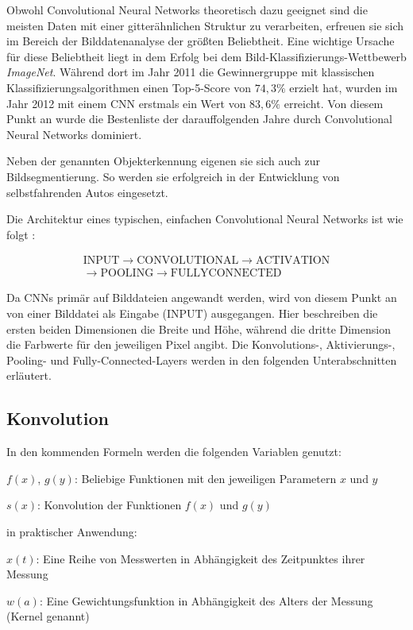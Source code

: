 Obwohl Convolutional Neural Networks theoretisch dazu geeignet sind die meisten Daten mit einer gitterähnlichen Struktur zu verarbeiten, erfreuen sie sich im Bereich der Bilddatenanalyse der größten Beliebtheit. \cite[Kap.~9]{deeplearning_16} Eine wichtige Ursache für diese Beliebtheit liegt \bspw in dem Erfolg bei dem Bild-Klassifizierungs-Wettbewerb \textit{ImageNet}. Während dort im Jahr 2011 die Gewinnergruppe mit klassischen Klassifizierungsalgorithmen einen Top-5-Score von $74,3\%$ erzielt hat, wurden im Jahr 2012 mit einem CNN erstmals ein Wert von $83,6\%$ erreicht. Von diesem Punkt an wurde die Bestenliste der darauffolgenden Jahre durch Convolutional Neural Networks dominiert. \cite[Kap.~1]{deeplearning_18}

Neben der genannten Objekterkennung eigenen sie sich auch zur Bildsegmentierung. So werden sie \bspw erfolgreich in der Entwicklung von selbstfahrenden Autos eingesetzt. \cite{kaymak_19}

Die Architektur eines typischen, einfachen Convolutional Neural Networks ist wie folgt \cite{cs231n}:

\begin{multline*}
\mathrm{INPUT}\rightarrow\mathrm{CONVOLUTIONAL}\rightarrow\mathrm{ACTIVATION}\\\rightarrow\mathrm{POOLING}\rightarrow\mathrm{FULLYCONNECTED}
\end{multline*}

Da CNNs primär auf Bilddateien angewandt werden, wird von diesem Punkt an von einer Bilddatei als Eingabe ($\mathrm{INPUT}$) ausgegangen. Hier beschreiben die ersten beiden Dimensionen die Breite und Höhe, während die dritte Dimension die Farbwerte für den jeweiligen Pixel angibt. Die Konvolutions-, Aktivierungs-, Pooling- und Fully-Connected-Layers werden in den folgenden Unterabschnitten erläutert.

\subsection{Konvolution}
\label{ssec:conv}

\noindent In den kommenden Formeln werden die folgenden Variablen genutzt:
\begin{description}
\item  $f(x)$, $g(y)$: Beliebige Funktionen mit den jeweiligen Parametern $x$ und $y$
\item  $s(x)$: Konvolution der Funktionen $f(x)$ und $g(y)$\\
\end{description}
\noindent \Bzw in praktischer Anwendung:
\begin{description}
\item  $x(t)$: Eine Reihe von Messwerten in Abhängigkeit des Zeitpunktes ihrer Messung
\item  $w(a)$: Eine Gewichtungsfunktion in Abhängigkeit des Alters der Messung (\iA Kernel genannt)
\end{description}


